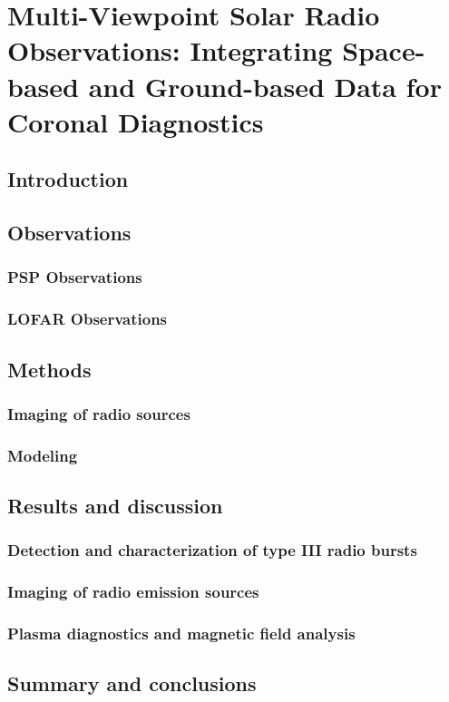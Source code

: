 \chapter{Multi-Viewpoint Solar Radio Observations: Integrating Space-based and Ground-based Data for Coronal Diagnostics}

\section{Introduction}


\section{Observations}

\subsection{PSP Observations}

\subsection{LOFAR Observations}


\section{Methods}

\subsection{Imaging of radio sources}

\subsection{Modeling}


\section{Results and discussion}

\subsection{Detection and characterization of type III radio bursts}

\subsection{Imaging of radio emission sources}

\subsection{Plasma diagnostics and magnetic field analysis}


\section{Summary and conclusions}


